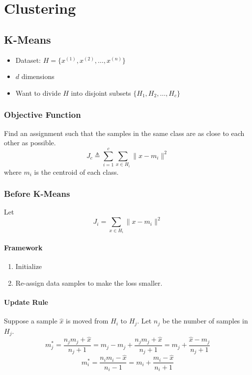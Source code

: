 \chapter{Clustering}
\newpage


\section{K-Means}
\begin{itemize}
    \item Dataset: $H=\{x^{(1)},x^{(2)},\dots,x^{(n)}\}$
    \item $d$ dimensions
    \item Want to divide $H$ into disjoint subsets $\{H_1,H_2,\dots,H_c\}$
\end{itemize}

\subsection{Objective Function}
Find an assignment such that the samples in the same class are as close to each other as possible.
\[ J_c \triangleq \sum_{i=1}^c\sum_{x\in H_i} \|x-m_i\|^2 \]
where $m_i$ is the centroid of each class.

\subsection{Before K-Means}
Let
\[ J_i = \sum_{x\in H_i}\|x-m_i\|^2 \]

\subsubsection{Framework}
\begin{enumerate}
    \item Initialize
    \item Re-assign data samples to make the loss smaller.
\end{enumerate}

\subsubsection{Update Rule}
Suppose a sample $\hat{x}$ is moved from $H_i$ to $H_j$. Let $n_j$ be the number of samples in $H_j$.
\[ m^*_j = \frac{n_jm_j + \hat{x}}{n_j+1} = m_j - m_j + \frac{n_jm_j + \hat{x}}{n_j+1} = m_j + \frac{\hat{x}-m_j}{n_j+1} \]
\[ m^*_i = \frac{n_im_i - \hat{x}}{n_i-1} = m_i + \frac{m_i - \hat{x}}{n_i+1} \]

